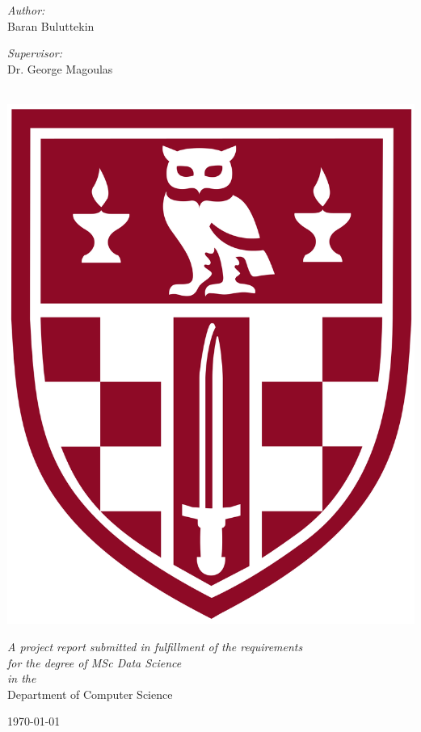 \documentclass[12pt, twoside, a4paper]{report}
\begin{document}
\begin{titlepage}
\begin{center}
        \begin{minipage}[t]{0.4\textwidth}
        \begin{flushleft} \large
        \emph{Author:}\\
        {Baran Buluttekin}
        \end{flushleft}
        \end{minipage}
        \begin{minipage}[t]{0.4\textwidth}
        \begin{flushright} \large
        \emph{Supervisor:} \\
        {Dr. George Magoulas} 
        \end{flushright}
        \end{minipage}\\
        [2cm] 
        \includegraphics[scale=0.05]{img/birkbeck-shield.png}
            \vfill

            \large \textit{A project report submitted in fulfillment of the requirements\\ for the degree of MSc Data Science}\\[0.3cm] 
            \textit{in the}\\[0.4cm]
            Department of Computer Science\\[2cm] 
 
            \vfill

            {\large \today}\\[4cm] 
 
            \vfill
    \end{center}
\end{titlepage}    
\thispagestyle{empty}
\cleardoublepage
\end{document}
